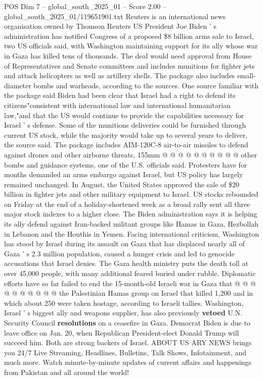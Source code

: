 \begin{textsample}{POS Dim 7 – global\_south\_2025\_01 – Score 2.00 – global\_south\_2025\_01/119651901.txt}  \label{ex:f7_pos_256}
Reuters is an international news organisation owned by Thomson Reuters US President Joe Biden ' s administration has notified Congress of a proposed \$8 billion arms sale to Israel, two US officials said, with Washington maintaining support for its ally whose war in Gaza has killed tens of thousands.
The deal would need approval from House of Representatives and Senate committees and includes munitions for fighter jets and attack helicopters as well as artillery shells.
The package also includes small-diameter bombs and warheads, according to the sources.
One source familiar with the package said Biden had been clear that Israel had a right to defend its citizens"consistent with international law and international humanitarian law,"and that the US would continue to provide the capabilities necessary for Israel ' s defense.
Some of the munitions deliveries could be furnished through current US stock, while the majority would take up to several years to deliver, the source said.
The package includes AIM-120C-8 air-to-air missiles to defend against drones and other airborne threats, 155mm @ @ @ @ @ @ @ @ @ @ other bombs and guidance systems, one of the U.S. officials said.
Protesters have for months demanded an arms embargo against Israel, but US policy has largely remained unchanged.
In August, the United States approved the sale of \$20 billion in fighter jets and other military equipment to Israel.
US stocks rebounded on Friday at the end of a holiday-shortened week as a broad rally sent all three major stock indexes to a higher close.
The Biden administration says it is helping its ally defend against Iran-backed militant groups like Hamas in Gaza, Hezbollah in Lebanon and the Houthis in Yemen.
Facing international criticism, Washington has stood by Israel during its assault on Gaza that has displaced nearly all of Gaza ' s 2.3 million population, caused a hunger crisis and led to genocide accusations that Israel denies.
The Gaza health ministry puts the death toll at over 45,000 people, with many additional feared buried under rubble.
Diplomatic efforts have so far failed to end the 15-month-old Israeli war in Gaza that @ @ @ @ @ @ @ @ @ @ the Palestinian Hamas group on Israel that killed 1,200 and in which about 250 were taken hostage, according to Israeli tallies.
Washington, Israel ' s biggest ally and weapons supplier, has also previously \textbf{vetoed} U.N.
Security Council \textbf{resolutions} on a ceasefire in Gaza.
Democrat Biden is due to leave office on Jan. 20, when Republican President-elect Donald Trump will succeed him.
Both are strong backers of Israel.
ABOUT US ARY NEWS brings you 24/7 Live Streaming, Headlines, Bulletins, Talk Shows, Infotainment, and much more.
Watch minute-by-minute updates of current affairs and happenings from Pakistan and all around the world!

\end{textsample}
